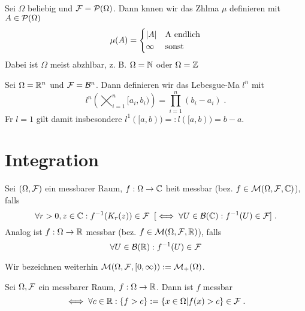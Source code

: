 \begin{ex}
	Sei \(\Omega\) beliebig und \(\mathcal{F} = \mathcal{P}(\Omega)\). Dann k\os nnen wir das Z\as hlma\s{}  $\mu$ definieren mit \(A \in \mathcal{P}(\Omega)\)
	\[\mu(A) = \begin{cases}\ab{A} & $A$ \text{ endlich}\\ \infty & \text{sonst}\end{cases} \] 
	Dabei ist $\Omega$ meist abz\as hlbar, z. B. \(\Omega = \mathbb{N}\) oder \(\Omega = \mathbb{Z}\)
\end{ex}

\begin{ex}
	Sei \(\Omega = \mathbb{R}^n\) und \(\mathcal{F} = \mathcal{B} ^n\). Dann definieren wir das Lebesgue-Ma\s{} $l^n$ mit 
	\[l^n\left(\bigtimes_{i=1}^n [a_i, b_i)\right) = \prod_{i=1}^n (b_i -a_i)\;.\]
	F\us r $l=1$ gilt damit insbesondere \(l^1([a,b)) =: l([a,b)) = b-a\).
\end{ex}

\section{Integration}
\begin{definition}
	Sei \((\Omega, \mathcal{F})\) ein messbarer Raum, \(f:\Omega\to \mathbb{C}\) hei\s t messbar (bez. \(f\in \mathcal{M} (\Omega, \mathcal{F}, \mathbb{C})\)), falls
	\[\forall r > 0, z \in \mathbb{C}: f^{-1}(K_r(z)) \in \mathcal{F} \;\;[\iff \forall U \in \mathcal{B}(\mathbb{C}) : f^{-1}(U) \in \mathcal{F}]\;.\]
	Analog ist \(f:\Omega \to \mathbb{R}\) messbar (bez. \(f \in \mathcal{M} (\Omega, \mathcal{F}, \mathbb{R})\)), falls
	\[\forall U \in \mathcal{B}(\mathbb{R}): f^{-1}(U) \in \mathcal{F}\]
\end{definition}
\begin{rem}
	Wir bezeichnen weiterhin \(\mathcal{M}(\Omega, \mathcal{F}, [0,\infty)) := \mathcal{M}_+(\Omega)\).
\end{rem}
\begin{rem}
	Sei \(\Omega, \mathcal{F}\) ein messbarer Raum, \(f: \Omega \to \mathbb{R}\). Dann ist $f$ messbar 
	\[\iff \forall c\in \mathbb{R}: \left\{f > c\right\} := \left\{x\in \Omega \vert f(x) > c\right\} \in \mathcal{F}\;.\]
\end{rem}


